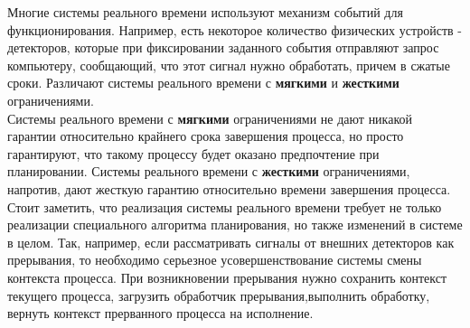 Многие системы реального времени используют механизм событий для функционирования. Например, есть некоторое количество физических устройств - детекторов, которые при фиксировании заданного события отправляют запрос компьютеру, сообщающий, что этот сигнал нужно обработать, причем в сжатые сроки. Различают системы реального времени с \textbf{мягкими} и \textbf{жесткими} ограничениями.\\
Системы реального времени с \textbf{мягкими} ограничениями не дают никакой гарантии относительно крайнего срока завершения процесса, но просто гарантируют, что такому процессу будет оказано предпочтение при планировании. Системы реального времени с \textbf{жесткими} ограничениями, напротив, дают жесткую гарантию относительно времени завершения процесса. Стоит заметить, что реализация системы реального времени требует не только реализации специального алгоритма планирования, но также изменений в системе в целом. Так, например, если рассматривать сигналы от внешних детекторов как прерывания, то необходимо серьезное усовершенствование системы смены контекста процесса. При возникновении прерывания нужно сохранить контекст текущего процесса, загрузить обработчик прерывания,выполнить обработку, вернуть контекст прерванного процесса на исполнение.\\

